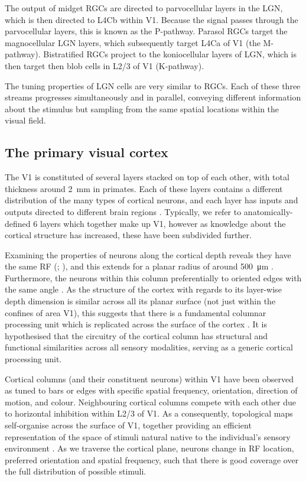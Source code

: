 The output of midget \acp{RGC} are directed to parvocellular layers in the \ac{LGN}, which is then directed to \ac{L4Cb} within \ac{V1}.
Because the signal passes through the parvocellular layers, this is known as the P-pathway.
Parasol \acp{RGC} target the magnocellular \ac{LGN} layers, which subsequently target \ac{L4Ca} of \ac{V1} (the M-pathway).
Bistratified \acp{RGC} project to the koniocellular layers of \ac{LGN}, which is then target then blob cells in \acs{L2/3} of \ac{V1} (K-pathway).

The tuning properties of \ac{LGN} cells are very similar to \acp{RGC}.
Each of these three streams progresses simultaneously and in parallel, conveying different information about the stimulus but sampling from the same spatial locations within the visual field.


\subsection{The primary visual cortex}
\label{sec:bg_v1}

The \acf{V1} is constituted of several layers stacked on top of each other, with total thickness around \SI{2}{\milli\metre} in primates.
Each of these layers contains a different distribution of the many types of cortical neurons, and each layer has inputs and outputs directed to different brain regions \citep{Harris2013}.
Typically, we refer to anatomically-defined \num{6} layers which together make up \ac{V1}, however as knowledge about the cortical structure has increased, these have been subdivided further.

Examining the properties of neurons along the cortical depth reveals they have the same \ac{RF} (\citealp{Hubel1962}; \citealp{Hubel1963}), and this extends for a planar radius of around \SI{500}{\micro\metre} \citep{Mountcastle1997}.
Furthermore, the neurons within this column preferentially to oriented edges with the same angle \citep{Hubel1962}.
As the structure of the cortex with regards to its layer-wise depth dimension is similar across all its planar surface (not just within the confines of area \ac{V1}), this suggests that there is a fundamental columnar processing unit which is replicated across the surface of the cortex \citep{Mountcastle1957}.
It is hypothesised that the circuitry of the cortical column has structural and functional similarities across all sensory modalities, serving as a generic cortical processing unit.

Cortical columns (and their constituent neurons) within \ac{V1} have been observed as tuned to bars or edges with specific spatial frequency, orientation, direction of motion, and colour.
Neighbouring cortical columns compete with each other due to horizontal inhibition within \acs{L2/3} of \ac{V1}.
As a consequently, topological maps self-organise across the surface of \ac{V1}, together providing an efficient representation of the space of stimuli natural native to the individual's sensory environment \citep{Miikkulainen2005,Stevens2013,Wilson2015}.
As we traverse the cortical plane, neurons change in \ac{RF} location, preferred orientation and spatial frequency, such that there is good coverage over the full distribution of possible stimuli.


